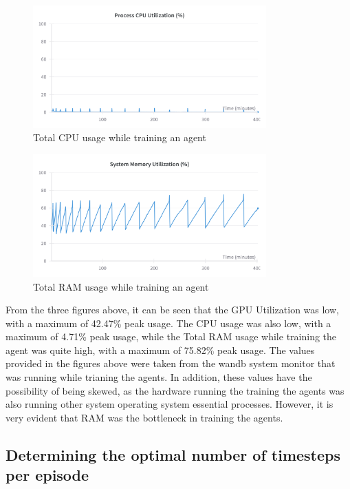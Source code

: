 \begin{figure}[H]
    \centering
    \includegraphics[width=0.8\textwidth]{figures/total_cpu_utilization.png}
    \caption{Total CPU usage while training an agent}
    \label{fig:ram_usage}
\end{figure}

\begin{figure}[H]
    \centering
    \includegraphics[width=0.8\textwidth]{figures/System_RAM_Utilization.png}
    \caption{Total RAM usage while training an agent}
    \label{fig:sys_memory_useage}
\end{figure}

From the three figures above, it can be seen that the GPU Utilization was low, with a maximum of 42.47\% peak usage. The CPU usage was also low, with a maximum of 4.71\% peak usage, while the Total RAM usage while training the agent was quite high, with a maximum of 75.82\% peak usage. The values provided in the figures above were taken from the wandb system monitor that was running while trianing the agents. In addition, these values have the possibility of being skewed, as the hardware running the training the agents was also running other system operating system essential processes. However, it is very evident that RAM was the bottleneck in training the agents.  

\subsection{Determining the optimal number of timesteps per episode}

